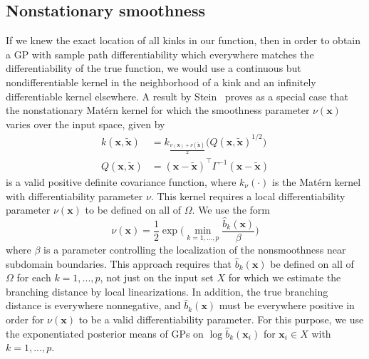 \documentclass{article}
\renewcommand{\vec}[1]{\mathbf{#1}}
\numberwithin{equation}{section}
\begin{document}
\subsection{Nonstationary smoothness}
If we knew the exact location of all kinks in our function, then in order to obtain a GP with sample path differentiability which everywhere matches the differentiability of the true function, we would use a continuous but nondifferentiable kernel in the neighborhood of a kink and an infinitely differentiable kernel elsewhere. A result by Stein~\cite{stein2005nonstationary} proves as a special case that the nonstationary Mat\'ern kernel for which the smoothness parameter $\nu(\vec{x})$ varies over the input space, given by
\begin{align*}
  k(\vec{x}, \tilde{\vec{x}})
  & = k_{\frac{\nu(\vec{x}) + \nu(\tilde{\vec{x}})}{2}}\Big(Q(\vec{x}, \tilde{\vec{x}})^{1/2}\Big) \\
  Q(\vec{x}, \tilde{\vec{x}}) & = (\vec{x} - \tilde{\vec{x}})^\top \Gamma^{-1} (\vec{x} - \tilde{\vec{x}})
\end{align*}
is a valid positive definite covariance function, where $k_\nu(\cdot)$ is the Mat\'ern kernel with differentiability parameter $\nu$. This kernel requires a local differentiability parameter $\nu(\vec{x})$ to be defined on all of $\Omega$. We use the form
\begin{equation}
  \nu(\vec{x}) = \frac{1}{2} \exp\bigg(\min_{k=1,...,p} \frac{\hat{b}_k(\vec{x})}{\beta} \bigg) \label{eq:smoothness}
\end{equation}
where $\beta$ is a parameter controlling the localization of the nonsmoothness near subdomain boundaries. This approach requires that $\hat{b}_k(\vec{x})$ be defined on all of $\Omega$ for each $k=1,...,p$, not just on the input set $X$ for which we estimate the branching distance by local linearizations. In addition, the true branching distance is everywhere nonnegative, and $\hat{b}_k(\vec{x})$ must be everywhere positive in order for $\nu(\vec{x})$ to be a valid differentiability parameter. For this purpose, we use the exponentiated posterior means of GPs on $\log \hat{b}_k(\vec{x}_i)$ for $\vec{x}_i \in X$ with $k=1,...,p$.
\end{document}
